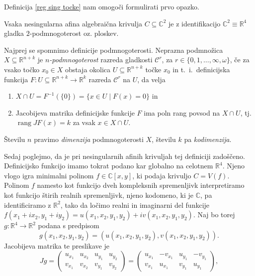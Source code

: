 \documentclass[mat1]{fmfdelo}
\newcommand{\tikzmark}[1]{\tikz[overlay,remember picture,baseline=(#1.base)]
\node (#1) {\strut};}
\numberwithin{equation}{section}
\newcommand{\R}{\mathbb R}
\newcommand{\C}{\mathbb C}
\DeclareMathOperator{\rang}{rang}
\theoremstyle{definition}
\begin{document}
Definicija \ref{reg sing tocke} nam omogoči formulirati prvo opazko.

\begin{trditev}
    Vsaka nesingularna afina algebraična krivulja $C \subseteq \C^2$ je z identifikacijo $\C^2 \equiv \R^4$ gladka $2$-podmnogoterost oz. ploskev.
\end{trditev}

\begin{dokaz}
    Najprej se spomnimo definicije podmnogoterosti. Neprazna podmnožica $X \subseteq \R^{n+k}$ je \emph{$n$-podmnogoterost} razreda gladkosti $\mathcal{C}^r$, za $r \in \{0,1,\dots, \infty, \omega\}$, če za vsako točko $x_0 \in X$ obstaja okolica $U \subseteq \R^{n+k}$ točke $x_0$ in t.~i.\ definicijska funkcija $F: U \subseteq \R^{n+k} \to \R^k$ razreda $\mathcal{C}^r$ na $U$, da velja
    \begin{enumerate}
        \item $X \cap U = F^{-1}(\{0\}) = \{x \in U \mid F(x) = 0\}$ in
        \item Jacobijeva matrika definicijske funkcije $F$ ima poln rang povsod na $X \cap U$, tj. $\rang J F(x) = k$ za vsak $x \in X \cap U$.
    \end{enumerate}
    Številu $n$ pravimo \emph{dimenzija} podmnogoterosti $X$, številu $k$ pa \emph{kodimenzija}.
    \\
    \par
    Sedaj poglejmo, da je pri nesingularnih afinih krivuljah tej definiciji zadoščeno. Definicijsko funkcijo imamo tokrat podano kar globalno na celotnem $\R^4$. Njeno vlogo igra minimalni polinom $f \in \C[x,y]$, ki podaja krivuljo $C = V(f)$. Polinom $f$ namesto kot funkcijo dveh kompleksnih spremenljivk interpretiramo kot funkcijo štirih realnih spremenljivk, njeno kodomeno, ki je $\C$, pa identificiramo z $\R^2$, tako da ločimo realni in imaginarni del funkcije $f(x_1 + ix_2, y_1 + iy_2) = u(x_1,x_2,y_1,y_2) + iv(x_1,x_2,y_1,y_2)$. Naj bo torej $g: \R^4 \to \R^2$ podana s predpisom
    \[
        g(x_1,x_2,y_1,y_2) = (u(x_1,x_2,y_1,y_2), v(x_1,x_2,y_1,y_2)).
    \]
    Jacobijeva matrika te preslikave je
    \[
    Jg = 
    \begin{pmatrix}
        u_{x_1} & u_{x_2} & u_{y_1} & u_{y_2} \\
        v_{x_1} & v_{x_2} & v_{y_1} & v_{y_2}
    \end{pmatrix}
    =
    \begin{pmatrix}
        u_{x_1} & -v_{x_1} & u_{y_1} & -v_{y_1} \\
        v_{x_1} & u_{x_1} & v_{y_1} & u_{y_1}
    \end{pmatrix},
    \]
        

\end{dokaz}
\end{document}
